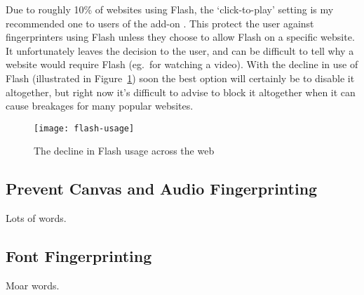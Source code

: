 Due to roughly 10\% of websites using Flash, the `click-to-play' setting is my recommended one to users of the add-on \citep{flash-usage}.
This protect the user against fingerprinters using Flash unless they choose to allow Flash on a specific website.
It unfortunately leaves the decision to the user, and can be difficult to tell why a website would require Flash (eg.\ for watching a video).
With the decline in use of Flash (illustrated in Figure~\ref{fig:flash-usage}) soon the best option will certainly be to disable it altogether, but right now it's difficult to advise to block it altogether when it can cause breakages for many popular websites.

\begin{figure}[h!]
\caption{The decline in Flash usage across the web}
\texttt{[image: flash-usage]}
\centering
\label{fig:flash-usage}
\end{figure}

\subsection{Prevent Canvas and Audio Fingerprinting}

Lots of words.

\subsection{Font Fingerprinting}

Moar words.

